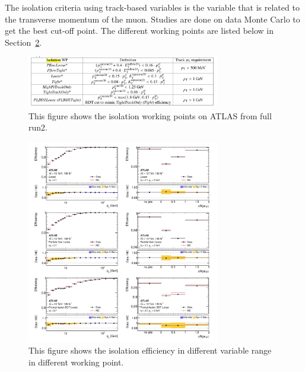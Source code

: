 The isolation criteria using track-based variables is the variable that is related to the transverse momentum of the muon. Studies are done on data Monte Carlo to get the best cut-off point. The different working points are listed below in Section~\ref{fig:isolationWP}.

\begin{figure}[!htb]
    \begin{center}
        \includegraphics[width=0.75\textwidth]{figures/common_ana/Isolation}
        \caption 
        {
            This figure shows the isolation working points on ATLAS from full run2\cite{Aad:2746302}.}
        \label{fig:isolationWP}
    \end{center}
\end{figure}

\begin{figure}[!htb]
    \begin{center}
        \includegraphics[width=0.75\textwidth]{figures/common_ana/IsolationEff1}
        \caption{
            This figure shows the isolation efficiency in different variable range in different working point\cite{Aad:2746302}.
        }
        \label{fig:isolationWP}
    \end{center}
\end{figure}


